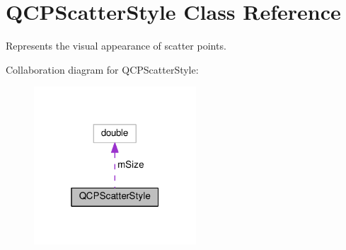 \hypertarget{classQCPScatterStyle}{}\section{Q\+C\+P\+Scatter\+Style Class Reference}
\label{classQCPScatterStyle}


Represents the visual appearance of scatter points.  




Collaboration diagram for Q\+C\+P\+Scatter\+Style\+:
\nopagebreak
\begin{figure}[H]
\begin{center}
\leavevmode
\includegraphics[width=172pt]{classQCPScatterStyle__coll__graph}
\end{center}
\end{figure}
